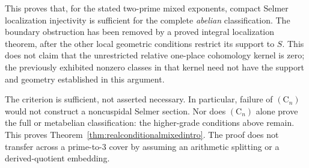 \begin{remark}\label{rem:real-mixed-criterion-limits}
This proves that, for the stated two-prime
mixed exponents, compact Selmer localization
injectivity is sufficient for the complete
\emph{abelian} classification.
The boundary obstruction has been removed
by a proved integral localization theorem,
after the other local geometric conditions
restrict its support to $S$.
This does not claim that the unrestricted
relative one-place cohomology kernel is zero;
the previously exhibited nonzero classes
in that kernel need not have the support
and geometry established in this argument.

The criterion is sufficient, not asserted
necessary.  In particular, failure of
$(\mathrm C_n)$ would not construct a
noncuspidal Selmer section.
Nor does $(\mathrm C_n)$ alone prove the
full or metabelian classification: the
higher-grade conditions above remain.
This proves Theorem~\ref{thm:realconditionalmixedintro}.
The proof does not transfer across a
prime-to-$3$ cover by assuming an
arithmetic splitting or a derived-quotient
embedding.
\end{remark}

